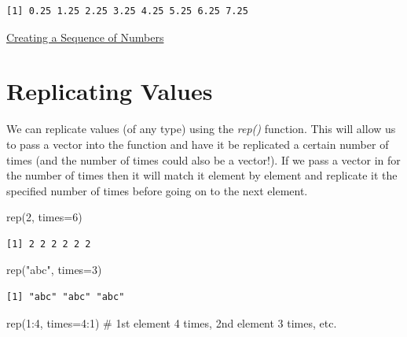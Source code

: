 \documentclass[
  letterpaper,
  DIV=11,
  numbers=noendperiod]{scrreprt}
\newenvironment{Shaded}{\begin{snugshade}}{\end{snugshade}}
\newcommand{\AttributeTok}[1]{\textcolor[rgb]{0.40,0.45,0.13}{#1}}
\newcommand{\CommentTok}[1]{\textcolor[rgb]{0.37,0.37,0.37}{#1}}
\newcommand{\DecValTok}[1]{\textcolor[rgb]{0.68,0.00,0.00}{#1}}
\newcommand{\FunctionTok}[1]{\textcolor[rgb]{0.28,0.35,0.67}{#1}}
\newcommand{\NormalTok}[1]{\textcolor[rgb]{0.00,0.23,0.31}{#1}}
\newcommand{\SpecialCharTok}[1]{\textcolor[rgb]{0.37,0.37,0.37}{#1}}
\newcommand{\StringTok}[1]{\textcolor[rgb]{0.13,0.47,0.30}{#1}}
\begin{document}
\begin{verbatim}
[1] 0.25 1.25 2.25 3.25 4.25 5.25 6.25 7.25
\end{verbatim}

\begin{watch}{}{}
    \href{https://youtu.be/c4qJ3Y5hJ0s}{Creating a Sequence of Numbers}
\end{watch}

\section{Replicating Values}\label{replicating-values}

We can replicate values (of any type) using the \emph{rep()} function.
This will allow us to pass a vector into the function and have it be
replicated a certain number of times (and the number of times could also
be a vector!). If we pass a vector in for the number of times then it
will match it element by element and replicate it the specified number
of times before going on to the next element.

\begin{Shaded}
\begin{Highlighting}[]
\FunctionTok{rep}\NormalTok{(}\DecValTok{2}\NormalTok{, }\AttributeTok{times=}\DecValTok{6}\NormalTok{)}
\end{Highlighting}
\end{Shaded}

\begin{verbatim}
[1] 2 2 2 2 2 2
\end{verbatim}

\begin{Shaded}
\begin{Highlighting}[]
\FunctionTok{rep}\NormalTok{(}\StringTok{"abc"}\NormalTok{, }\AttributeTok{times=}\DecValTok{3}\NormalTok{)}
\end{Highlighting}
\end{Shaded}

\begin{verbatim}
[1] "abc" "abc" "abc"
\end{verbatim}

\begin{Shaded}
\begin{Highlighting}[]
\FunctionTok{rep}\NormalTok{(}\DecValTok{1}\SpecialCharTok{:}\DecValTok{4}\NormalTok{, }\AttributeTok{times=}\DecValTok{4}\SpecialCharTok{:}\DecValTok{1}\NormalTok{) }\CommentTok{\# 1st element 4 times, 2nd element 3 times, etc.}
\end{Highlighting}
\end{Shaded}
\end{document}
